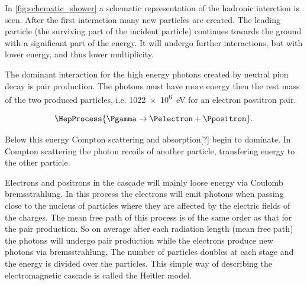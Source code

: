 In \cref{fig:schematic_shower} a schematic representation of the hadronic interction is seen. After the first interaction many new particles are created. The leading particle (the surviving part of the incident particle) continues towards the ground with a significant part of the energy. It will undergo further interactions, but with lower energy, and thus lower multiplicity.

The dominant interaction for the high energy photons created by neutral pion decay is pair production. The photons must have more energy then the rest mass of the two produced particles, i.e. \SI{1022e6}{\eV} for an electron postitron pair.

\begin{equation}
\HepProcess{\Pgamma \to \Pelectron + \Ppositron}.
\end{equation}

Below this energy Compton scattering and absorption[?] begin to dominate. In Compton scattering the photon recoils of another particle, transfering energy to the other particle.

Electrons and positrons in the cascade will mainly loose energy via Coulomb bremsstrahlung. In this process the electrons will emit photons when passing close to the nucleus of particles where they are affected by the electric fields of the charges. The mean free path of this process is of the same order as that for the pair production. So on average after each radiation length (mean free path) the photons will undergo pair production while the electrons produce new photons via bremsstrahlung. The number of particles doubles at each stage and the energy is divided over the particles. This simple way of describing the electromagnetic cascade is called the Heitler model.

